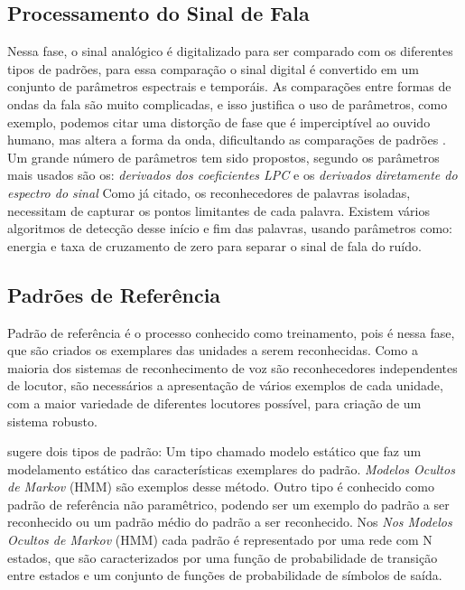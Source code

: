 \subsection{Processamento do Sinal de Fala}
Nessa fase, o sinal analógico é digitalizado para ser comparado com os diferentes tipos de padrões, para essa comparação o sinal digital é convertido em um conjunto de parâmetros espectrais e temporáis. As comparações entre formas de ondas da fala são muito complicadas, e isso justifica o uso de parâmetros, como exemplo, podemos citar uma distorção de fase que é imperciptível ao ouvido humano, mas altera a forma da onda, dificultando as comparações de padrões .\cite{AvaliaTecJose}
Um grande número de parâmetros tem sido propostos, segundo \cite{AvaliaTecJose} os parâmetros mais usados são os: \textit{derivados dos coeficientes LPC} e os \textit{derivados diretamente do espectro do sinal}
Como já citado, os reconhecedores de palavras isoladas, necessitam de capturar os pontos limitantes de cada palavra. Existem vários algoritmos de detecção desse início e fim das palavras, usando parâmetros como: energia e taxa de cruzamento de zero para separar o sinal de fala do ruído. \cite{AvaliaTecJose}

\subsection{Padrões de Referência}
Padrão de referência é o processo conhecido como treinamento, pois é nessa fase, que são criados os exemplares das unidades a serem reconhecidas. Como a maioria dos sistemas de reconhecimento de voz são reconhecedores independentes de locutor, são necessários a apresentação de vários exemplos de cada unidade, com a maior variedade de diferentes locutores possível, para criação de um sistema robusto. \cite{AvaliaTecJose}

\cite{DigSpeechNejat} sugere dois tipos de padrão: Um tipo chamado modelo estático que faz um modelamento estático das características exemplares do padrão. \textit{Modelos Ocultos de Markov} (HMM) \cite{FundamentRabiner} são exemplos desse método. Outro tipo é conhecido como padrão de referência não paramêtrico, podendo ser um exemplo do padrão a ser reconhecido ou um padrão médio do padrão a ser reconhecido. \cite{AvaliaTecJose}
Nos \textit{Nos Modelos Ocultos de Markov} (HMM) cada padrão é representado por uma rede com N estados, que são caracterizados por uma função de probabilidade de transição entre estados e um conjunto de funções de probabilidade de símbolos de saída. \cite{AvaliaTecJose}


